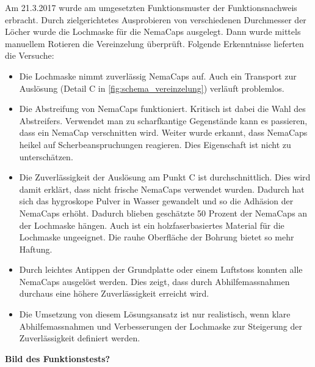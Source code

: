 \newline
Am 21.3.2017 wurde am umgesetzten Funktionsmuster der Funktionsnachweis erbracht. Durch zielgerichtetes Ausprobieren von verschiedenen Durchmesser der Löcher wurde die Lochmaske für die NemaCaps ausgelegt. Dann wurde mittels manuellem Rotieren die Vereinzelung überprüft.
\newline
\newline
Folgende Erkenntnisse lieferten die Versuche:
\begin{itemize}
	\item Die Lochmaske nimmt zuverlässig NemaCaps auf. Auch ein Transport zur Auslösung (Detail C in \ref{fig:schema_vereinzelung}) verläuft problemlos.
	
	\item Die Abstreifung von NemaCaps funktioniert. Kritisch ist dabei die Wahl des Abstreifers. Verwendet man zu scharfkantige Gegenstände kann es passieren, dass ein NemaCap verschnitten wird. Weiter wurde erkannt, dass NemaCaps heikel auf Scherbeanspruchungen reagieren. Dies Eigenschaft ist nicht zu unterschätzen.
		
	\item Die Zuverlässigkeit der Auslösung am Punkt C ist durchschnittlich. Dies wird damit erklärt, dass nicht frische NemaCaps verwendet wurden. Dadurch hat sich das hygroskope Pulver in Wasser gewandelt und so die Adhäsion der NemaCaps erhöht. Dadurch blieben geschätzte 50 Prozent der NemaCaps an der Lochmaske hängen. Auch ist ein holzfaserbasiertes Material für die Lochmaske ungeeignet. Die rauhe Oberfläche der Bohrung bietet so mehr Haftung.
	
	\item Durch leichtes Antippen der Grundplatte oder einem Luftstoss konnten alle NemaCaps ausgelöst werden. Dies zeigt, dass durch Abhilfemassnahmen durchaus eine höhere Zuverlässigkeit erreicht wird.
	
	\item Die Umsetzung von diesem Lösungsansatz ist nur realistisch, wenn klare Abhilfemassnahmen und Verbesserungen der Lochmaske zur Steigerung der Zuverlässigkeit definiert werden. 
\end{itemize} 
\textbf{Bild des Funktionstests?}

